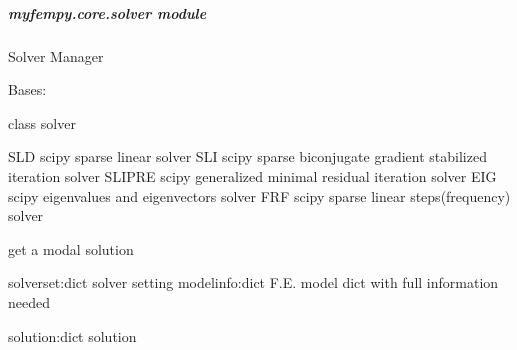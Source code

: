 \documentclass[letterpaper,10pt,english]{sphinxmanual}
\begin{document}
\subparagraph{myfempy.core.solver module}
\label{\detokenize{myfempy.core:module-myfempy.core.solver}}\label{\detokenize{myfempy.core:myfempy-core-solver-module}}
\sphinxAtStartPar
Solver Manager

\begin{fulllineitems}
\label{\detokenize{myfempy.core:myfempy.core.solver.Solver}}
\pysigstartsignatures
{}
\pysigstopsignatures
\sphinxAtStartPar
Bases: 

\sphinxAtStartPar
class solver

\sphinxAtStartPar
SLD     \textendash{} scipy sparse linear solver 
SLI     \textendash{} scipy sparse biconjugate gradient stabilized iteration solver 
SLIPRE  \textendash{} scipy generalized minimal residual iteration solver
EIG     \textendash{} scipy eigenvalues and eigenvectors solver
FRF     \textendash{} scipy sparse linear steps(frequency) solver

\begin{fulllineitems}
\label{\detokenize{myfempy.core:myfempy.core.solver.Solver.get_modal_solve}}
\pysigstartsignatures
{}
\pysigstopsignatures
\sphinxAtStartPar
get a modal solution
\begin{description}
\sphinxAtStartPar
solverset:dict  \textendash{} solver setting
modelinfo:dict  \textendash{} F.E. model dict with full information needed

\sphinxAtStartPar
solution:dict   \textendash{} solution

\end{description}

\end{fulllineitems}


\end{fulllineitems}
\end{document}
